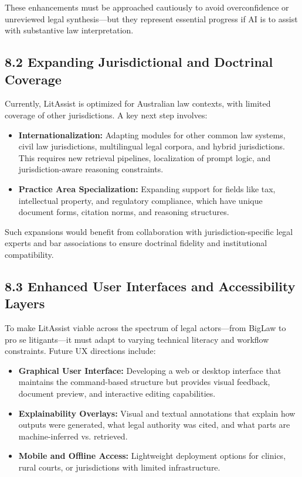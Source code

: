 \documentclass[12pt,a4paper]{article}
\begin{document}
These enhancements must be approached cautiously to avoid overconfidence or unreviewed legal synthesis—but they represent essential progress if AI is to assist with substantive law interpretation.

\subsection*{8.2 Expanding Jurisdictional and Doctrinal Coverage}

Currently, LitAssist is optimized for Australian law contexts, with limited coverage of other jurisdictions. A key next step involves:

\begin{itemize}
\item \textbf{Internationalization:} Adapting modules for other common law systems, civil law jurisdictions, multilingual legal corpora, and hybrid jurisdictions. This requires new retrieval pipelines, localization of prompt logic, and jurisdiction-aware reasoning constraints.

\item \textbf{Practice Area Specialization:} Expanding support for fields like tax, intellectual property, and regulatory compliance, which have unique document forms, citation norms, and reasoning structures.
\end{itemize}

Such expansions would benefit from collaboration with jurisdiction-specific legal experts and bar associations to ensure doctrinal fidelity and institutional compatibility.

\subsection*{8.3 Enhanced User Interfaces and Accessibility Layers}

To make LitAssist viable across the spectrum of legal actors—from BigLaw to pro se litigants—it must adapt to varying technical literacy and workflow constraints. Future UX directions include:

\begin{itemize}
\item \textbf{Graphical User Interface:} Developing a web or desktop interface that maintains the command-based structure but provides visual feedback, document preview, and interactive editing capabilities.

\item \textbf{Explainability Overlays:} Visual and textual annotations that explain how outputs were generated, what legal authority was cited, and what parts are machine-inferred vs. retrieved.

\item \textbf{Mobile and Offline Access:} Lightweight deployment options for clinics, rural courts, or jurisdictions with limited infrastructure.
\end{itemize}
\end{document}
